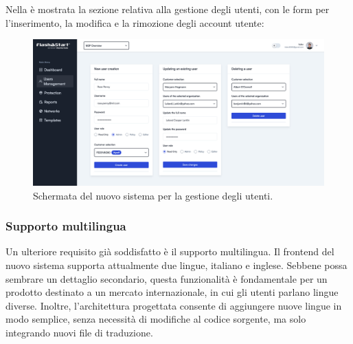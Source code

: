 Nella  è mostrata la sezione relativa alla gestione degli utenti, con le form per l'inserimento, la modifica e la rimozione degli account utente:

\begin{figure}
  \centering
  \includegraphics[width=1\textwidth]{figures/new-user-panel.png}
  \caption{Schermata del nuovo sistema per la gestione degli utenti.}
  \label{fig:user-management}
\end{figure}

\subsubsection{Supporto multilingua}
Un ulteriore requisito già soddisfatto è il supporto multilingua. Il frontend del nuovo sistema supporta attualmente due lingue, italiano e inglese. Sebbene possa sembrare un dettaglio secondario, questa funzionalità è fondamentale per un prodotto destinato a un mercato internazionale, in cui gli utenti parlano lingue diverse. Inoltre, l’architettura progettata consente di aggiungere nuove lingue in modo semplice, senza necessità di modifiche al codice sorgente, ma solo integrando nuovi file di traduzione.

